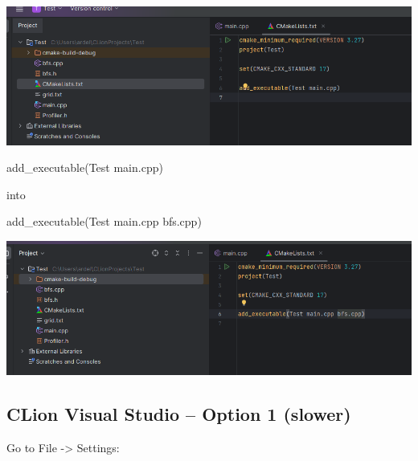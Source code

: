 \documentclass[../en-fa-lab.tex]{subfiles}
\begin{document}
\includegraphics[width=\textwidth,alt={A screenshot of a computer Description automatically generated}]{./Resources/tutorial_lab9/image17.png}

add\_executable(Test main.cpp)

into

add\_executable(Test main.cpp bfs.cpp)

\includegraphics[width=\textwidth,alt={A screenshot of a computer Description automatically generated}]{./Resources/tutorial_lab9/image18.png}

\subsection{CLion Visual Studio -- Option 1
(slower)}\label{clion-visual-studio-option-1-slower}

Go to File -\textgreater{} Settings:
\end{document}
